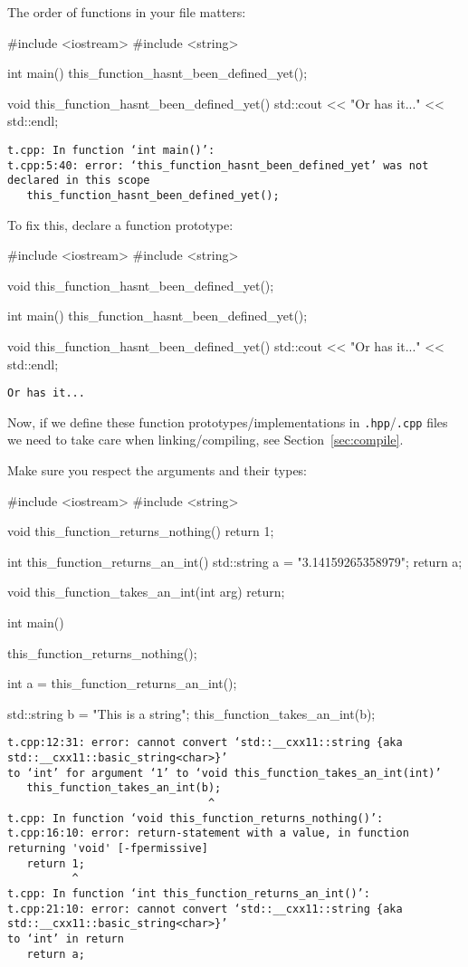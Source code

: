 \documentclass[12pt,letterpaper,twoside]{article}
\begin{document}
The order of functions in your file matters:
\begin{cpp}
#include <iostream>
#include <string>

int main() {
  this_function_hasnt_been_defined_yet();
}

void this_function_hasnt_been_defined_yet(){
	std::cout << "Or has it..." << std::endl;
}
\end{cpp}
\vspace{-3ex}
{\footnotesize
\begin{verbatim}
t.cpp: In function ‘int main()’:
t.cpp:5:40: error: ‘this_function_hasnt_been_defined_yet’ was not declared in this scope
   this_function_hasnt_been_defined_yet();
\end{verbatim}
}
To fix this, declare a function prototype:
\begin{cpp}
#include <iostream>
#include <string>

void this_function_hasnt_been_defined_yet();

int main() {
  this_function_hasnt_been_defined_yet();
}

void this_function_hasnt_been_defined_yet(){
	std::cout << "Or has it..." << std::endl;
}
\end{cpp}
\vspace{-3ex}
{\footnotesize
\begin{verbatim}
Or has it...
\end{verbatim}
}

Now, if we define these function prototypes/implementations in \texttt{.hpp}/\texttt{.cpp} files we need to take care when linking/compiling, see Section~\ref{sec:compile}.
\newpage

Make sure you respect the arguments and their types:
\begin{cpp}
#include <iostream>
#include <string>

void this_function_returns_nothing(){
  return 1;
}

int this_function_returns_an_int(){
  std::string a = "3.14159265358979";
  return a;
}

void this_function_takes_an_int(int arg){
  return;
}

int main() {
  this_function_returns_nothing();

  int a = this_function_returns_an_int();

  std::string b = "This is a string";
  this_function_takes_an_int(b);
}
\end{cpp}
\vspace{-3ex}
{\footnotesize
\begin{verbatim}
t.cpp:12:31: error: cannot convert ‘std::__cxx11::string {aka std::__cxx11::basic_string<char>}’ 
to ‘int’ for argument ‘1’ to ‘void this_function_takes_an_int(int)’
   this_function_takes_an_int(b);
                               ^
t.cpp: In function ‘void this_function_returns_nothing()’:
t.cpp:16:10: error: return-statement with a value, in function returning 'void' [-fpermissive]
   return 1;
          ^
t.cpp: In function ‘int this_function_returns_an_int()’:
t.cpp:21:10: error: cannot convert ‘std::__cxx11::string {aka std::__cxx11::basic_string<char>}’ 
to ‘int’ in return
   return a;
\end{verbatim}
}
\end{document}
